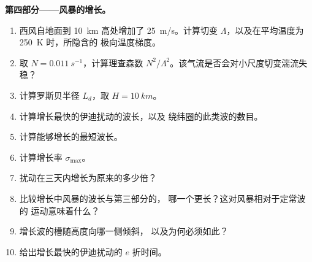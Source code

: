 \begin{problem}
\medskip\noindent\textbf{第四部分——风暴的增长。}
\begin{enumerate}[resume]
\item 西风自地面到 \qty{10}{km} 高处增加了
  \qty{25}{m/s}。计算切变 $\Lambda$，以及在平均温度为
  \qty{250}{K} 时，所隐含的
  极向温度梯度。
\item 取 $N = \qty{0.011}{s^{-1}}$，计算理查森数
  $N^2/\Lambda^2$。该气流是否会对小尺度切变湍流失稳？
\item 计算罗斯贝半径 $L_d$，取 $H = \qty{10}{km}$。
\item 计算增长最快的伊迪扰动的波长，以及
  绕纬圈的此类波的数目。
\item 计算能够增长的最短波长。
\item 计算增长率 $\sigma_{\max}$。
\item 扰动在三天内增长为原来的多少倍？
\item 比较增长中风暴的波长与第三部分的，
  哪一个更长？这对风暴相对于定常波的
  运动意味着什么？
\item 增长波的槽随高度向哪一侧倾斜，
  以及为何必须如此？
\item 给出增长最快的伊迪扰动的 $e$ 折时间。
\end{enumerate}
\end{problem}
